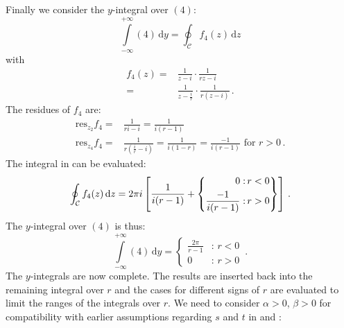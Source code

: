 Finally we consider the $y$-integral over $(4)$:
\begin{equation}
  \int\limits_{-\infty}^{+\infty}
    (4) \,\mathrm{d}y
= \oint_\mathcal{C}
    f_4(z) \,\mathrm{d}z \label{eqn:int_f4}
\end{equation}
with
\begin{align}
  f_4(z) =& \frac{1}{z - i}           \cdot \frac{1}{r z - i} \\
         =& \frac{1}{z - \frac{i}{r}} \cdot \frac{1}{r(z - i)} \, .
\end{align}
The residues of $f_4$ are:
\begin{align}
 \mathrm{res}_{z_2} f_4 =& \frac{1}{r i -i}
                        =  \frac{1}{i (r - 1)} \\
 \mathrm{res}_{z_4} f_4 =& \frac{1}{r(\frac{i}{r} - i)}
                        =  \frac{1}{i(1 - r)}
                        =  \frac{-1}{i(r - 1)}
                        \textrm{ for } r>0 \, .
\end{align}
The integral in  can be evaluated:
\begin{equation}
   \oint_\mathcal{C} f_4(z) \,\mathrm{d}z
 = 2 \pi i \left[ \frac{1}{i(r - 1)} \\
                 +\left\{ \begin{aligned}
                   0                   :&\, r < 0 \\
                   \frac{-1}{i(r - 1)} :&\, r > 0
                  \end{aligned} \right\}
 \right] \, .
\end{equation}
The $y$-integral over $(4)$ is thus:
\begin{equation}
   \int\limits_{-\infty}^{+\infty} (4) \,\mathrm{d}y
 = \begin{cases}
    \frac{2 \pi}{r-1} &:\, r<0 \\
    0                 &:\, r>0
   \end{cases} \, .
\end{equation}
The $y$-integrals are now complete. The results are inserted back into the remaining
integral over $r$ and the cases for different signs of $r$ are evaluated to limit the ranges of the integrals over $r$.
We need to consider $\alpha>0$, $\beta>0$ for compatibility with earlier assumptions
regarding $s$ and $t$ in  and :
